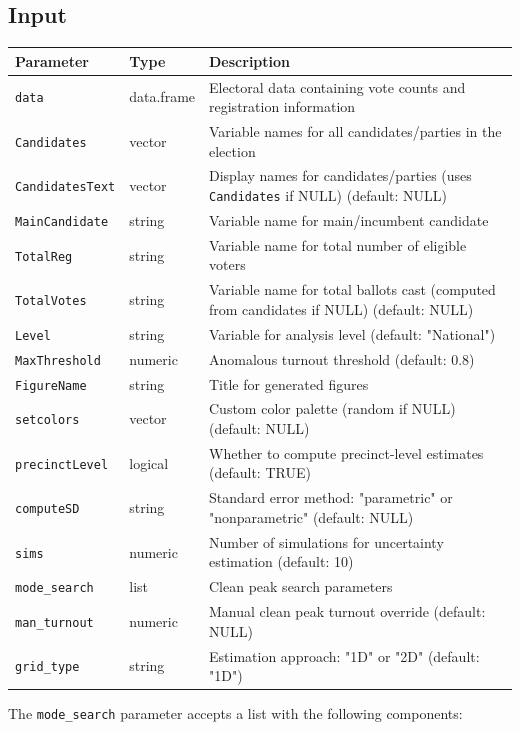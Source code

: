 \documentclass{article}
\begin{document}
\subsection{Input}
\begin{longtable}{p{4cm}p{3cm}p{7cm}}
\toprule
\textbf{Parameter} & \textbf{Type} & \textbf{Description} \\
\midrule
\texttt{data} & data.frame & Electoral data containing vote counts and registration information \\
\texttt{Candidates} & vector & Variable names for all candidates/parties in the election \\
\texttt{CandidatesText} & vector & Display names for candidates/parties (uses \texttt{Candidates} if NULL) (default: NULL) \\
\texttt{MainCandidate} & string & Variable name for main/incumbent candidate \\
\texttt{TotalReg} & string & Variable name for total number of eligible voters \\
\texttt{TotalVotes} & string & Variable name for total ballots cast (computed from candidates if NULL) (default: NULL) \\
\texttt{Level} & string & Variable for analysis level (default: "National") \\
\texttt{MaxThreshold} & numeric & Anomalous turnout threshold (default: 0.8) \\
\texttt{FigureName} & string & Title for generated figures \\
\texttt{setcolors} & vector & Custom color palette (random if NULL) (default: NULL) \\
\texttt{precinctLevel} & logical & Whether to compute precinct-level estimates (default: TRUE) \\
\texttt{computeSD} & string & Standard error method: "parametric" or "nonparametric" (default: NULL) \\
\texttt{sims} & numeric & Number of simulations for uncertainty estimation (default: 10) \\
\texttt{mode\_search} & list & Clean peak search parameters \\
\texttt{man\_turnout} & numeric & Manual clean peak turnout override (default: NULL) \\
\texttt{grid\_type} & string & Estimation approach: "1D" or "2D" (default: "1D") \\
\bottomrule
\end{longtable}

The \texttt{mode\_search} parameter accepts a list with the following components:
\end{document}
